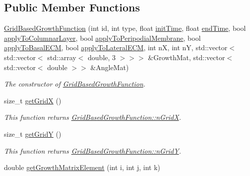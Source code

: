 \subsection*{Public Member Functions}
\begin{DoxyCompactItemize}
\item 
\hyperlink{classGridBasedGrowthFunction_a41bd402824d5c21605d65db0024cb38a}{Grid\+Based\+Growth\+Function} (int id, int type, float \hyperlink{classGrowthFunctionBase_ae92513a7b41637df8e26e7db35ddf97c}{init\+Time}, float \hyperlink{classGrowthFunctionBase_a3ff4db0573d354a75666a5f3ca446941}{end\+Time}, bool \hyperlink{classGrowthFunctionBase_a3d56771e7c145589a14e11cc331e0326}{apply\+To\+Columnar\+Layer}, bool \hyperlink{classGrowthFunctionBase_a08ae19f58cb98fa8e315a77f52749732}{apply\+To\+Peripodial\+Membrane}, bool \hyperlink{classGrowthFunctionBase_a9fe46fc6dde4041b79204beb48972a09}{apply\+To\+Basal\+E\+C\+M}, bool \hyperlink{classGrowthFunctionBase_ac623b1dbe376bce5dddbe1a2e21c776f}{apply\+To\+Lateral\+E\+C\+M}, int n\+X, int n\+Y, std\+::vector$<$ std\+::vector$<$ std\+::array$<$ double, 3 $>$$>$$>$ \&Growth\+Mat, std\+::vector$<$ std\+::vector$<$ double $>$$>$ \&Angle\+Mat)
\begin{DoxyCompactList}\small\item\em The constructor of \hyperlink{classGridBasedGrowthFunction}{Grid\+Based\+Growth\+Function}. \end{DoxyCompactList}\item 
\hypertarget{classGridBasedGrowthFunction_a7626a18bc3893b052e0d792f98572c24}{}size\+\_\+t \hyperlink{classGridBasedGrowthFunction_a7626a18bc3893b052e0d792f98572c24}{get\+Grid\+X} ()\label{classGridBasedGrowthFunction_a7626a18bc3893b052e0d792f98572c24}

\begin{DoxyCompactList}\small\item\em This function returns \hyperlink{classGridBasedGrowthFunction_a6d36f433ad29dd4f36352900d3795469}{Grid\+Based\+Growth\+Function\+::n\+Grid\+X}. \end{DoxyCompactList}\item 
\hypertarget{classGridBasedGrowthFunction_a65e797afcf1dff440c7cc1d08e1bab1f}{}size\+\_\+t \hyperlink{classGridBasedGrowthFunction_a65e797afcf1dff440c7cc1d08e1bab1f}{get\+Grid\+Y} ()\label{classGridBasedGrowthFunction_a65e797afcf1dff440c7cc1d08e1bab1f}

\begin{DoxyCompactList}\small\item\em This function returns \hyperlink{classGridBasedGrowthFunction_ac992521b24e1975df1c7372c11285217}{Grid\+Based\+Growth\+Function\+::n\+Grid\+Y}. \end{DoxyCompactList}\item 
\hypertarget{classGridBasedGrowthFunction_a1775fe1788bc97569c892d01cc625ea8}{}double \hyperlink{classGridBasedGrowthFunction_a1775fe1788bc97569c892d01cc625ea8}{get\+Growth\+Matrix\+Element} (int i, int j, int k)\label{classGridBasedGrowthFunction_a1775fe1788bc97569c892d01cc625ea8}


\end{DoxyCompactItemize}
